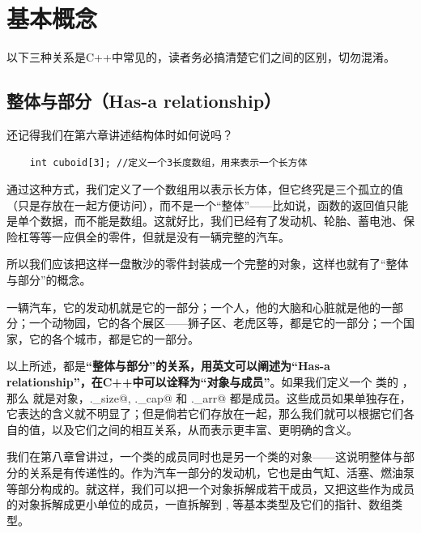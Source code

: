 \section{基本概念}
以下三种关系是C++中常见的，读者务必搞清楚它们之间的区别，切勿混淆。\par
\subsection*{整体与部分（Has-a relationship）}
还记得我们在第六章讲述结构体时如何说吗？
\begin{lstlisting}
    int cuboid[3]; //定义一个3长度数组，用来表示一个长方体
\end{lstlisting}
通过这种方式，我们定义了一个数组用以表示长方体，但它终究是三个孤立的值（只是存放在一起方便访问），而不是一个``整体''——比如说，函数的返回值只能是单个数据，而不能是数组。这就好比，我们已经有了发动机、轮胎、蓄电池、保险杠等等一应俱全的零件，但就是没有一辆完整的汽车。\par
所以我们应该把这样一盘散沙的零件封装成一个完整的对象，这样也就有了``整体与部分''的概念。\par
一辆汽车，它的发动机就是它的一部分；一个人，他的大脑和心脏就是他的一部分；一个动物园，它的各个展区——狮子区、老虎区等，都是它的一部分；一个国家，它的各个城市，都是它的一部分。\par
以上所述，都是\textbf{``整体与部分''的关系，用英文可以阐述为``Has-a relationship''，在C++中可以诠释为``对象与成员''}。如果我们定义一个 \lstinline@valarri@ 类的 \lstinline@a@，那么 \lstinline@a@ 就是对象，\lstinline@a._size@, \lstinline@a._cap@ 和 \lstinline@a._arr@ 都是成员。这些成员如果单独存在，它表达的含义就不明显了；但是倘若它们存放在一起，那么我们就可以根据它们各自的值，以及它们之间的相互关系，从而表示更丰富、更明确的含义。\par
我们在第八章曾讲过，一个类的成员同时也是另一个类的对象——这说明整体与部分的关系是有传递性的。作为汽车一部分的发动机，它也是由气缸、活塞、燃油泵等部分构成的。就这样，我们可以把一个对象拆解成若干成员，又把这些作为成员的对象拆解成更小单位的成员，一直拆解到 \lstinline@int@, \lstinline@double@ 等基本类型及它们的指针、数组类型。\par\pagebreak
